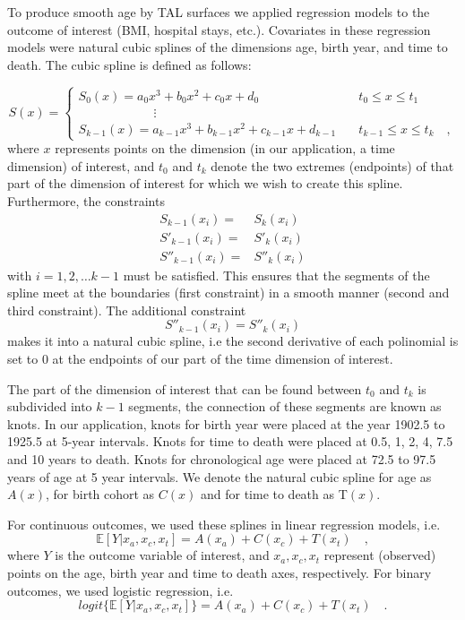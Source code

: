 \documentclass[11pt,oneside,a4paper]{article} %
\begin{document}
\begin{appendices}
To produce smooth age by TAL surfaces we applied regression models to the
outcome of interest (BMI, hospital stays, etc.). Covariates in these regression models were natural cubic splines of the dimensions age, birth year, and time to death. The cubic spline is defined as follows:

\begin{equation}
S(x) = \begin{cases}
    S_0(x) = a_0x^3+b_0x^2+c_0x+d_0 &\quad t_0 \le x \le t_1 \\
    \quad\quad\quad\quad\quad\quad \vdots \\
    S_{k-1}(x) = a_{k-1}x^3 +b_{k-1}x^2+c_{k-1}x+d_{k-1} &\quad t_{k-1} \le x \le t_k        \quad ,   
\end{cases}
\end{equation}
where $x$ represents points on the dimension (in our application, a time dimension) of interest, and $t_0$ and $t_k$  denote the two extremes (endpoints) of that part of the dimension of interest for which we wish to create this spline. Furthermore, the constraints
\begin{align}
S_{k-1}(x_i) =& S_k(x_i)\\
S'_{k-1}(x_i) =& S'_k(x_i)\\
S''_{k-1}(x_i) =& S''_k(x_i)
\end{align}
with $i=1,2,\ldots k-1$ must be satisfied. This ensures that the segments of the spline meet at the boundaries (first constraint) in a smooth manner (second and third constraint). The additional constraint
\begin{equation}
S''_{k-1}(x_i) = S''_k(x_i)
\end{equation}
makes it into a natural cubic spline, i.e the second derivative of each polinomial is set to 0 at the endpoints of our part of the time dimension of interest.

The part of the dimension of interest that can be found between $t_0$ and $t_k$ is subdivided into $k-1$ segments, the connection of these segments are known as knots. In our application, knots for birth year were placed at the year 1902.5 to 1925.5 at 5-year intervals. Knots for time to death were placed at 0.5, 1, 2, 4, 7.5 and 10 years to death. Knots for chronological age were placed at 72.5 to 97.5 years of age at 5 year intervals. We denote the natural cubic spline for age as $A(x)$, for birth cohort as $C(x)$ and for time to death as T$(x)$.

For continuous outcomes, we used these splines in linear regression models, i.e.
\begin{equation}
\mathbb{E}[Y| x_a,x_c,x_t]=A(x_a)+C(x_c)+T(x_t) \quad,
\end{equation}
where $Y$ is the outcome variable of interest, and $x_a,x_c,x_t$ represent (observed) points on the age, birth year and time to death axes, respectively. For binary outcomes, we used logistic regression, i.e.
\begin{equation}
logit\{\mathbb{E}[Y| x_a,x_c,x_t]\}=A(x_a)+C(x_c)+T(x_t) \quad .
\end{equation}


\end{appendices}
\end{document}
